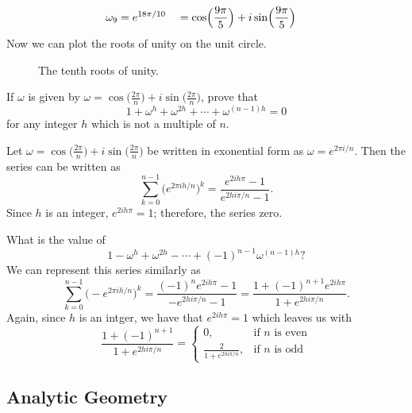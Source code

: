 \begin{exercise}
\begin{alignat*}{2}
    \omega_9 & = e^{18\pi/10} &&{}=
    \cos\Bigl(\frac{9\pi}{5}\Bigr) + i\sin\Bigl(\frac{9\pi}{5}\Bigr)
  \end{alignat*}
  Now we can plot the roots of unity on the unit circle.
  \begin{figure}[H]
    \centering
    
    \caption{The tenth roots of unity.}
  \end{figure}
\item
  If \(\omega\) is given by \(\omega = \cos\bigl(\frac{2\pi}{n}\bigr) +
  i\sin\bigl(\frac{2\pi}{n}\bigr)\), prove that
  \[
  1 + \omega^h + \omega^{2h} + \cdots + \omega^{(n - 1)h} = 0
  \]
  for any integer \(h\) which is not a multiple of \(n\).
  \par\smallskip
  Let \(\omega = \cos\bigl(\frac{2\pi}{n}\bigr) +
  i\sin\bigl(\frac{2\pi}{n}\bigr)\) be written in exonential form as
  \(\omega = e^{2\pi i/n}\).
  Then the series can be written as
  \[
  \sum_{k = 0}^{n - 1}\bigl(e^{2\pi ih/n}\bigr)^k =
  \frac{e^{2ih\pi} - 1}{e^{2hi\pi/n} - 1}.
  \]
  Since \(h\) is an integer, \(e^{2ih\pi} = 1\); therefore, the series zero.
\item
  What is the value of
  \[
  1 - \omega^h + \omega^{2h} - \cdots + (-1)^{n - 1}\omega^{(n - 1)h}\mbox{?}
  \]
  We can represent this series similarly as
  \[
  \sum_{k = 0}^{n - 1}\bigl(-e^{2\pi ih/n}\bigr)^k =
  \frac{(-1)^ne^{2ih\pi} - 1}{-e^{2hi\pi/n} - 1} =
  \frac{1 + (-1)^{n + 1}e^{2ih\pi}}{1 + e^{2hi\pi/n}}.
  \]
  Again, since \(h\) is an intger, we have that \(e^{2ih\pi} = 1\) which leaves
  us with
  \[
  \frac{1 + (-1)^{n + 1}}{1 + e^{2hi\pi/n}} =
  \begin{cases}
    0, & \text{if \(n\) is even}\\
    \frac{2}{1 + e^{2hi\pi/n}}, & \text{if \(n\) is odd}
  \end{cases}
  \]
\end{exercise}

\subsection{Analytic Geometry}

